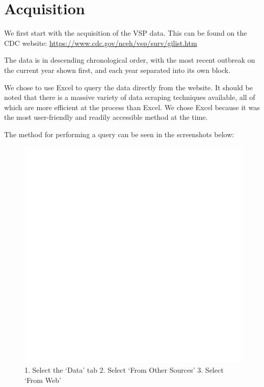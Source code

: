 \documentclass[
  11,
]{book}
\begin{document}
\hypertarget{acquisition}{%
\section*{Acquisition}\label{acquisition}}


We first start with the acquisition of the VSP data. This can be found on the CDC website: \url{https://www.cdc.gov/nceh/vsp/surv/gilist.htm}

The data is in descending chronological order, with the most recent outbreak on the current year shown first, and each year separated into its own block.

We chose to use Excel to query the data directly from the website. It should be noted that there is a massive variety of data scraping techniques available, all of which are more efficient at the process than Excel. We chose Excel because it was the most user-friendly and readily accessible method at the time.

The method for performing a query can be seen in the screenshots below:

\begin{figure}
\centering
\includegraphics{_book/_main_files/images/Excel_Query_Guide.png}
\caption{\label{fig:image1}1. Select the `Data' tab 2. Select `From Other Sources' 3. Select `From Web'}
\end{figure}
\end{document}
